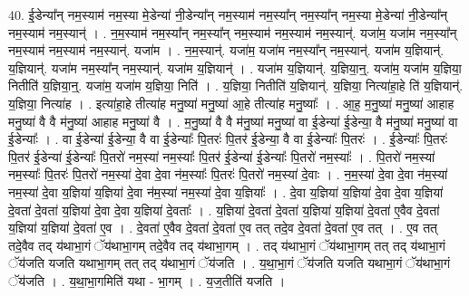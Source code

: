 \documentclass[17pt]{extarticle}
\begin{document}
40. ई॒डेन्या᳚न् नम॒स्याम॑ नम॒स्या मे॒डेन्या॑ नी॒डेन्या᳚न् नम॒स्याम॑ नम॒स्या᳚न् नम॒स्या᳚न् नम॒स्या मे॒डेन्या॑ नी॒डेन्या᳚न् नम॒स्याम॑ नम॒स्यान्॑ । . न॒म॒स्याम॑ नम॒स्या᳚न् नम॒स्या᳚न् नम॒स्याम॑ नम॒स्याम॑ नम॒स्यान्॑. यजा॑म॒ यजा॑म नम॒स्या᳚न् नम॒स्याम॑ नम॒स्याम॑ नम॒स्यान्॑. यजा॑म । . न॒म॒स्यान्॑. यजा॑म॒ यजा॑म नम॒स्या᳚न् नम॒स्यान्॑. यजा॑म य॒ज्ञियान्॑. य॒ज्ञियान्॑. यजा॑म नम॒स्या᳚न् नम॒स्यान्॑. यजा॑म य॒ज्ञियान्॑ । . यजा॑म य॒ज्ञियान्॑. य॒ज्ञिया॒न्॒. यजा॑म॒ यजा॑म य॒ज्ञिया॒ नितीति॑ य॒ज्ञिया॒न्॒. यजा॑म॒ यजा॑म य॒ज्ञिया॒ निति॑ । . य॒ज्ञिया॒ नितीति॑ य॒ज्ञियान्॑. य॒ज्ञिया॒ नित्या॑हा॒हे ति॑ य॒ज्ञियान्॑. य॒ज्ञिया॒ नित्या॑ह । . इत्या॑हा॒हे तीत्या॑ह मनु॒ष्या॑ मनु॒ष्या॑ आ॒हे तीत्या॑ह मनु॒ष्याः᳚ । . आ॒ह॒ म॒नु॒ष्या॑ मनु॒ष्या॑ आहाह मनु॒ष्या॑ वै वै म॑नु॒ष्या॑ आहाह मनु॒ष्या॑ वै । . म॒नु॒ष्या॑ वै वै म॑नु॒ष्या॑ मनु॒ष्या॑ वा ई॒डेन्या॑ ई॒डेन्या॒ वै म॑नु॒ष्या॑ मनु॒ष्या॑ वा ई॒डेन्याः᳚ । . वा ई॒डेन्या॑ ई॒डेन्या॒ वै वा ई॒डेन्याः᳚ पि॒तरः॑ पि॒तर॑ ई॒डेन्या॒ वै वा ई॒डेन्याः᳚ पि॒तरः॑ । . ई॒डेन्याः᳚ पि॒तरः॑ पि॒तर॑ ई॒डेन्या॑ ई॒डेन्याः᳚ पि॒तरो॑ नम॒स्या॑ नम॒स्याः᳚ पि॒तर॑ ई॒डेन्या॑ ई॒डेन्याः᳚ पि॒तरो॑ नम॒स्याः᳚ । . पि॒तरो॑ नम॒स्या॑ नम॒स्याः᳚ पि॒तरः॑ पि॒तरो॑ नम॒स्या॑ दे॒वा दे॒वा न॑म॒स्याः᳚ पि॒तरः॑ पि॒तरो॑ नम॒स्या॑ दे॒वाः । . न॒म॒स्या॑ दे॒वा दे॒वा न॑म॒स्या॑ नम॒स्या॑ दे॒वा य॒ज्ञिया॑ य॒ज्ञिया॑ दे॒वा न॑म॒स्या॑ नम॒स्या॑ दे॒वा य॒ज्ञियाः᳚ । . दे॒वा य॒ज्ञिया॑ य॒ज्ञिया॑ दे॒वा दे॒वा य॒ज्ञिया॑ दे॒वता॑ दे॒वता॑ य॒ज्ञिया॑ दे॒वा दे॒वा य॒ज्ञिया॑ दे॒वताः᳚ । . य॒ज्ञिया॑ दे॒वता॑ दे॒वता॑ य॒ज्ञिया॑ य॒ज्ञिया॑ दे॒वता॑ ए॒वैव दे॒वता॑ य॒ज्ञिया॑ य॒ज्ञिया॑ दे॒वता॑ ए॒व । . दे॒वता॑ ए॒वैव दे॒वता॑ दे॒वता॑ ए॒व तत् तदे॒व दे॒वता॑ दे॒वता॑ ए॒व तत् । . ए॒व तत् तदे॒वैव तद् य॑थाभा॒गं ॅय॑थाभा॒गम् तदे॒वैव तद् य॑थाभा॒गम् । . तद् य॑थाभा॒गं ॅय॑थाभा॒गम् तत् तद् य॑थाभा॒गं ॅय॑जति यजति यथाभा॒गम् तत् तद् य॑थाभा॒गं ॅय॑जति । . य॒था॒भा॒गं ॅय॑जति यजति यथाभा॒गं ॅय॑थाभा॒गं ॅय॑जति । . य॒था॒भा॒गमिति॑ यथा - भा॒गम् । . य॒ज॒तीति॑ यजति । \newline
\pagebreak
{}
\end{document}
